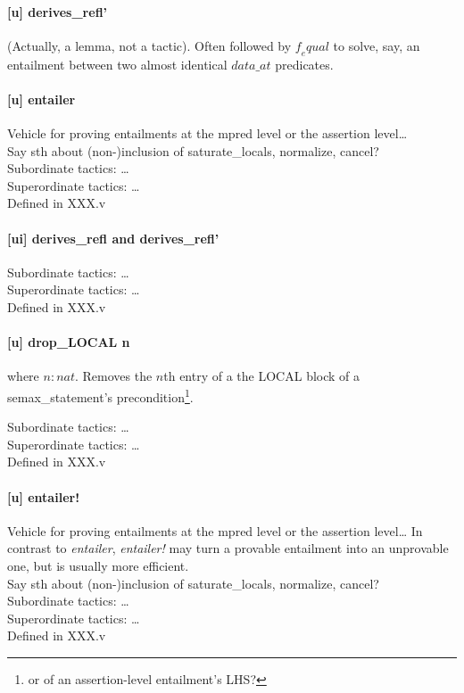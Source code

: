 \documentclass[12pt,fleqn,openany,oneside,showtrims]{memoir}
\begin{document}
\paragraph{[u] derives\_refl'}
(Actually, a lemma, not a tactic). Often followed by
$\mathit{f_equal}$ to solve, say, an entailment between two almost
identical $\mathit{data\_at}$ predicates.

\paragraph{[u] entailer}

Vehicle for proving entailments at the mpred level or the assertion
level\ldots\\
Say sth about (non-)inclusion of saturate\_locals, normalize, cancel?\\
Subordinate tactics: \ldots\\
Superordinate tactics: \ldots\\
Defined in  XXX.v\\


\paragraph{[ui] derives\_refl and derives\_refl'}

Subordinate tactics: \ldots\\
Superordinate tactics: \ldots\\
Defined in XXX.v

\paragraph{[u] drop\_LOCAL n}
where $n:nat$. Removes the $n$th entry of a the LOCAL block of a
semax\_statement's precondition\footnote{or of an assertion-level
  entailment's LHS?}.

Subordinate tactics: \ldots\\
Superordinate tactics: \ldots\\
Defined in XXX.v

\paragraph{[u] entailer!}

Vehicle for proving entailments at the mpred level or the assertion
level\ldots
In contrast to \emph{entailer}, \emph{entailer!} may turn a provable
entailment into an unprovable one, but is usually more efficient.\\
Say sth about (non-)inclusion of saturate\_locals, normalize, cancel?\\
Subordinate tactics: \ldots\\
Superordinate tactics: \ldots\\
Defined in  XXX.v
\end{document}
